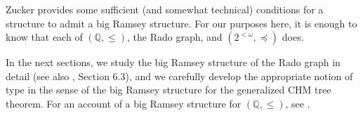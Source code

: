 Zucker \cite[Theorem 7.1]{Zucker-2019} provides some sufficient (and somewhat technical) conditions for a structure to admit a big Ramsey structure. For our purposes here, it is enough to know that each of $(\mathbb{Q},\leq)$, the Rado graph, and $(2^{<\omega},\preceq)$ does.

In the next sections, we study the big Ramsey structure of the Rado graph in detail (see also \cite{Zucker-2019}, Section 6.3), and we carefully develop the appropriate notion of type in the sense of the big Ramsey structure for the generalized CHM tree theorem. For an account of a big Ramsey structure for $(\mathbb{Q},\leq)$, see \cite[Section 6.2]{Zucker-2019}.





